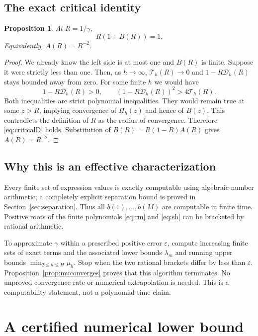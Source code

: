 \documentclass[11pt,letterpaper]{article}
\numberwithin{equation}{section}
\newtheorem{proposition}[theorem]{Proposition}
\theoremstyle{definition}
\begin{document}
\subsection{The exact critical identity}

\begin{proposition}\label{prop:critical}
At $R=1/\gamma$,
\begin{equation}\label{eq:criticalD}
 R(1+B(R))=1.
\end{equation}
Equivalently, $A(R)=R^{-2}$.
\end{proposition}
\begin{proof}
We already know the left side is at most one and $B(R)$ is finite.
Suppose it were strictly less than one. Then, as $h\to\infty$,
$\mathcal T_h(R)\to0$ and $1-R\mathcal D_h(R)$ stays bounded away from zero.
For some finite $h$ we would have
\[
 1-R\mathcal D_h(R)>0,\qquad
 (1-R\mathcal D_h(R))^2>4\mathcal T_h(R).
\]
Both inequalities are strict polynomial inequalities. They would remain true
at some $z>R$, implying convergence of $H_h(z)$ and hence of $B(z)$.
This contradicts the definition of $R$ as the radius of convergence.
Therefore \eqref{eq:criticalD} holds. Substitution of
$B(R)=R(1-R)A(R)$ gives $A(R)=R^{-2}$.
\end{proof}

\subsection{Why this is an effective characterization}

Every finite set of expression values is exactly computable using algebraic
number arithmetic; a completely explicit separation bound is proved in
Section~\ref{sec:separation}. Thus all $b(1),\ldots,b(M)$ are computable in
finite time. Positive roots of the finite polynomials
\eqref{eq:rm} and \eqref{eq:sh} can be bracketed by rational arithmetic.

To approximate $\gamma$ within a prescribed positive error $\varepsilon$,
compute increasing finite sets of exact terms and the associated lower bounds
$\lambda_m$ and running upper bounds $\min_{2\le h\le H}\mu_h$.
Stop when the two rational brackets differ by less than $\varepsilon$.
Proposition~\ref{prop:muconverges} proves that this algorithm terminates.
No unproved convergence rate or numerical extrapolation is needed.
This is a computability statement, not a polynomial-time claim.

\section{A certified numerical lower bound}
\end{document}
